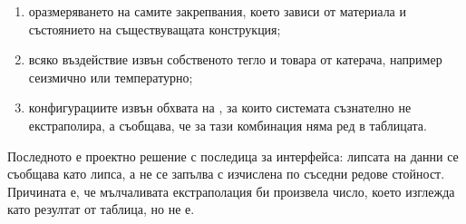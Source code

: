 \begin{enumerate}[topsep=2pt,itemsep=1pt,leftmargin=*]
\item оразмеряването на самите закрепвания, което зависи от материала и състоянието
      на съществуващата конструкция;
\item всяко въздействие извън собственото тегло и товара от катерача, например
      сеизмично или температурно;
\item конфигурациите извън обхвата на , за които системата
      съзнателно не екстраполира, а съобщава, че за тази комбинация няма ред в
      таблицата.
\end{enumerate}

Последното е проектно решение с последица за интерфейса: липсата на данни се
съобщава като липса, а не се запълва с изчислена по съседни редове стойност.
Причината е, че мълчаливата екстраполация би произвела число, което изглежда като
резултат от таблица, но не е.
